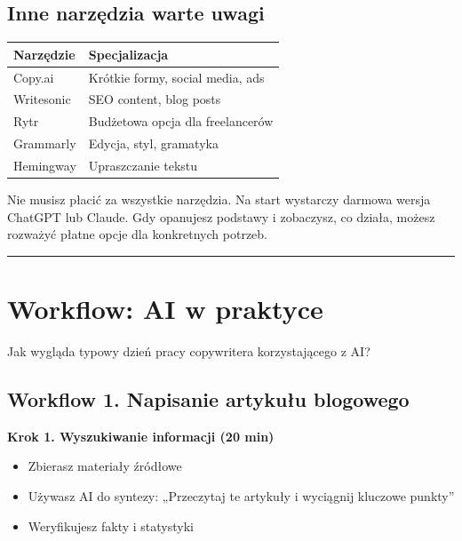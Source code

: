 \documentclass[
  12pt,
  a4paper,
  twoside,
  openright,
  12pt,
  DIV=12,
  BCOR=12mm]{scrbook}
\providecommand{\tightlist}{%
  \setlength{\itemsep}{0pt}\setlength{\parskip}{0pt}}\usepackage{longtable,booktabs,array}
\newcommand{\decoline}{%
  \begin{center}
    \textcolor{bordergray}{\rule{0.3\textwidth}{0.5pt}}
  \end{center}
}
\begin{document}
\subsection{Inne narzędzia warte
uwagi}\label{inne-narzux119dzia-warte-uwagi}

\begin{longtable}[]{@{}ll@{}}
\toprule\noalign{}
Narzędzie & Specjalizacja \\
\midrule\noalign{}
\endhead
\bottomrule\noalign{}
\endlastfoot
Copy.ai & Krótkie formy, social media, ads \\
Writesonic & SEO content, blog posts \\
Rytr & Budżetowa opcja dla freelancerów \\
Grammarly & Edycja, styl, gramatyka \\
Hemingway & Upraszczanie tekstu \\
\end{longtable}

\begin{wskazowka}
Nie musisz płacić za wszystkie narzędzia. Na start wystarczy darmowa wersja ChatGPT lub Claude. Gdy opanujesz podstawy i zobaczysz, co działa, możesz rozważyć płatne opcje dla konkretnych potrzeb.
\end{wskazowka}

\decoline

\section{Workflow: AI w praktyce}\label{workflow-ai-w-praktyce}

Jak wygląda typowy dzień pracy copywritera korzystającego z AI?

\subsection{Workflow 1. Napisanie artykułu
blogowego}\label{workflow-1.-napisanie-artykuux142u-blogowego}

\textbf{Krok 1. Wyszukiwanie informacji (20 min)}

\begin{itemize}
\tightlist
\item
  Zbierasz materiały źródłowe
\item
  Używasz AI do syntezy: „Przeczytaj te artykuły i wyciągnij kluczowe
  punkty''
\item
  Weryfikujesz fakty i statystyki
\end{itemize}
\end{document}
